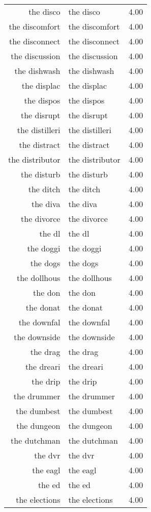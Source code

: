 \begin{table}[ht]
\begin{tabular}{rlr}
  the disco & the disco & 4.00 \\ 
  the discomfort & the discomfort & 4.00 \\ 
  the disconnect & the disconnect & 4.00 \\ 
  the discussion & the discussion & 4.00 \\ 
  the dishwash & the dishwash & 4.00 \\ 
  the displac & the displac & 4.00 \\ 
  the dispos & the dispos & 4.00 \\ 
  the disrupt & the disrupt & 4.00 \\ 
  the distilleri & the distilleri & 4.00 \\ 
  the distract & the distract & 4.00 \\ 
  the distributor & the distributor & 4.00 \\ 
  the disturb & the disturb & 4.00 \\ 
  the ditch & the ditch & 4.00 \\ 
  the diva & the diva & 4.00 \\ 
  the divorce & the divorce & 4.00 \\ 
  the dl & the dl & 4.00 \\ 
  the doggi & the doggi & 4.00 \\ 
  the dogs & the dogs & 4.00 \\ 
  the dollhous & the dollhous & 4.00 \\ 
  the don & the don & 4.00 \\ 
  the donat & the donat & 4.00 \\ 
  the downfal & the downfal & 4.00 \\ 
  the downside & the downside & 4.00 \\ 
  the drag & the drag & 4.00 \\ 
  the dreari & the dreari & 4.00 \\ 
  the drip & the drip & 4.00 \\ 
  the drummer & the drummer & 4.00 \\ 
  the dumbest & the dumbest & 4.00 \\ 
  the dungeon & the dungeon & 4.00 \\ 
  the dutchman & the dutchman & 4.00 \\ 
  the dvr & the dvr & 4.00 \\ 
  the eagl & the eagl & 4.00 \\ 
  the ed & the ed & 4.00 \\ 
  the elections & the elections & 4.00 \\ 

\end{tabular}
\end{table}
